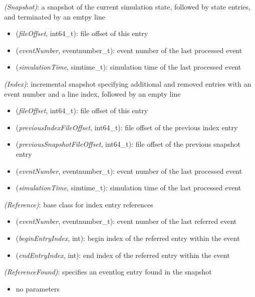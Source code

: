  \textit{(Snapshot)}: a snapshot of the current simulation state, followed by state entries, and terminated by an emtpy line

\begin{itemize}
  \item {} (\textit{fileOffset}, int64\_t): file offset of this entry
  \item \tbf{\#} (\textit{eventNumber}, eventnumber\_t): event number of the last processed event
  \item {} (\textit{simulationTime}, simtime\_t): simulation time of the last processed event
\end{itemize}

 \textit{(Index)}: incremental snapshot specifying additional and removed entries with an event number and a line index, followed by an empty line

\begin{itemize}
  \item {} (\textit{fileOffset}, int64\_t): file offset of this entry
  \item {} (\textit{previousIndexFileOffset}, int64\_t): file offset of the previous index entry
  \item {} (\textit{previousSnapshotFileOffset}, int64\_t): file offset of the previous snapshot entry
  \item \tbf{\#} (\textit{eventNumber}, eventnumber\_t): event number of the last processed event
  \item {} (\textit{simulationTime}, simtime\_t): simulation time of the last processed event
\end{itemize}

 \textit{(Reference)}: base class for index entry references

\begin{itemize}
  \item \tbf{\#} (\textit{eventNumber}, eventnumber\_t): event number of the last referred event
  \item {} (\textit{beginEntryIndex}, int): begin index of the referred entry within the event
  \item {} (\textit{endEntryIndex}, int): end index of the referred entry within the event
\end{itemize}

 \textit{(ReferenceFound)}: specifies an eventlog entry found in the snapshot

\begin{itemize}
  \item no parameters
\end{itemize}

